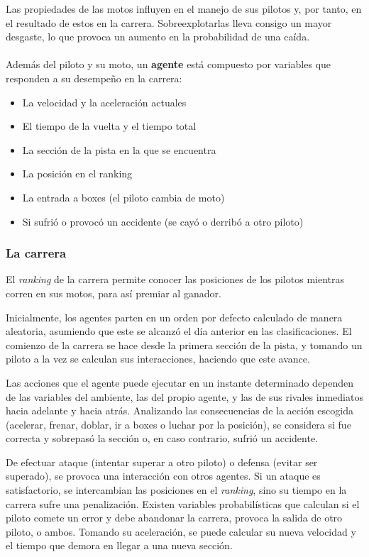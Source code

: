 \documentclass[12pt, letterpaper,spanish]{article}
\theoremstyle{definition}
\theoremstyle{remark}
\begin{document}
		Las propiedades de las motos influyen en el manejo de sus pilotos y, por tanto, en el resultado de estos en la carrera. Sobreexplotarlas lleva consigo un mayor desgaste, lo que provoca un aumento en la probabilidad de una caída. \\ \\ 

		Además del piloto y su moto, un \textbf{agente} está compuesto por variables que responden a su desempeño en la carrera:
		\begin{itemize}
    		\item La velocidad y la aceleración actuales
    		\item El tiempo de la vuelta y el tiempo total
    		\item La sección de la pista en la que se encuentra
    		\item La posición en el ranking
    		\item La entrada a boxes (el piloto cambia de moto)
    		\item Si sufrió o provocó un accidente (se cayó o derribó a otro piloto)
		\end{itemize}

		\subsubsection{La carrera}
		El \emph{ranking} de la carrera permite conocer las posiciones de los pilotos mientras corren en sus motos, para así premiar al ganador.

		Inicialmente, los agentes parten en un orden por defecto calculado de manera aleatoria, asumiendo que este se alcanzó el día anterior en las clasificaciones. El comienzo de la carrera se hace desde la primera sección de la pista, y tomando un piloto a la vez se calculan sus interacciones, haciendo que este avance.

		 Las acciones que el agente puede ejecutar en un instante determinado dependen de las variables del ambiente, las del propio agente, y las de sus rivales inmediatos hacia adelante y hacia atrás. Analizando las consecuencias de la acción escogida (acelerar, frenar, doblar, ir a boxes o luchar por la posición), se considera si fue correcta y sobrepasó la sección o, en caso contrario, sufrió un accidente. 

		De efectuar ataque (intentar superar a otro piloto) o defensa (evitar ser superado), se provoca una interacción con otros agentes. Si un ataque es satisfactorio, se intercambian las posiciones en el  \emph{ranking}, sino su tiempo en la carrera sufre una penalización. Existen variables probabilísticas que calculan si el piloto comete un error y debe abandonar la carrera, provoca la salida de otro piloto, o ambos. Tomando su aceleración, se puede calcular su nueva velocidad y el tiempo que demora en llegar a una nueva sección.
\end{document}
